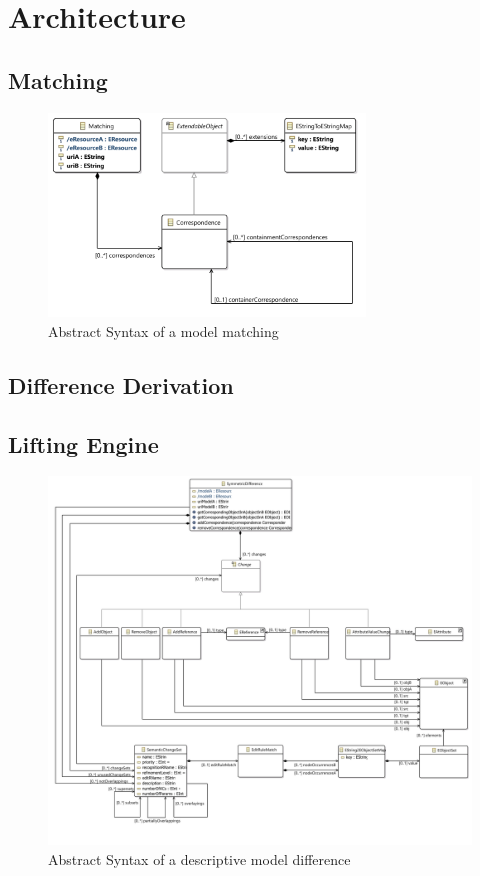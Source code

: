 \section{Architecture}

\subsection{Matching}



\begin{figure}[h!]
\centering
\includegraphics[width=0.75\textwidth]{images/architecture/matching_model}
\caption{Abstract Syntax of a model matching}
\end{figure}

\newpage


\subsection{Difference Derivation}

\newpage


\subsection{Lifting Engine}

\begin{figure}[h!]
\centering
\includegraphics[width=\textwidth]{images/architecture/symmetric_model}
\caption{Abstract Syntax of a descriptive model difference}
\end{figure}

